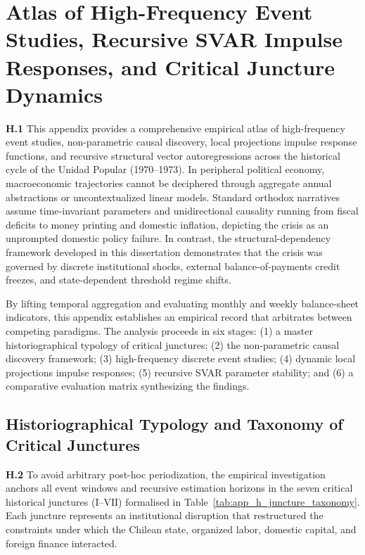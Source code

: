 \section{Atlas of High-Frequency Event Studies, Recursive SVAR Impulse Responses, and Critical Juncture Dynamics}
\label{app:event_irfs}

\textbf{H.1} This appendix provides a comprehensive empirical atlas of high-frequency event studies, non-parametric causal discovery, local projections impulse response functions, and recursive structural vector autoregressions across the historical cycle of the Unidad Popular (1970--1973). In peripheral political economy, macroeconomic trajectories cannot be deciphered through aggregate annual abstractions or uncontextualized linear models. Standard orthodox narratives \citep{DornbuschEdwards1990,Edwards2024} assume time-invariant parameters and unidirectional causality running from fiscal deficits to money printing and domestic inflation, depicting the crisis as an unprompted domestic policy failure. In contrast, the structural-dependency framework developed in this dissertation demonstrates that the crisis was governed by discrete institutional shocks, external balance-of-payments credit freezes, and state-dependent threshold regime shifts. 

By lifting temporal aggregation and evaluating monthly and weekly balance-sheet indicators, this appendix establishes an empirical record that arbitrates between competing paradigms. The analysis proceeds in six stages: (1) a master historiographical typology of critical junctures; (2) the non-parametric causal discovery framework; (3) high-frequency discrete event studies; (4) dynamic local projections impulse responses; (5) recursive SVAR parameter stability; and (6) a comparative evaluation matrix synthesizing the findings.

\subsection{Historiographical Typology and Taxonomy of Critical Junctures}
\label{app:juncture_taxonomy}

\textbf{H.2} To avoid arbitrary post-hoc periodization, the empirical investigation anchors all event windows and recursive estimation horizons in the seven critical historical junctures ($\mathrm{I}$--$\mathrm{VII}$) formalised in Table~\ref{tab:app_h_juncture_taxonomy}. Each juncture represents an institutional disruption that restructured the constraints under which the Chilean state, organized labor, domestic capital, and foreign finance interacted.


